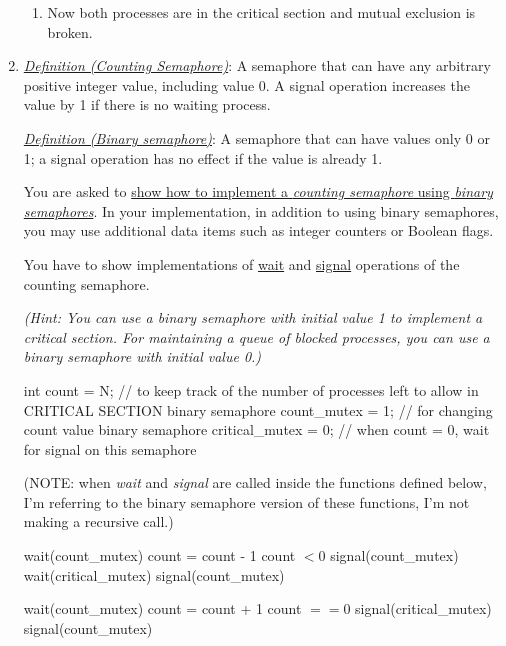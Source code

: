 \documentclass[11pt]{article}
\newcommand{\n}{\vspace{0.3cm}}
\begin{document}
\begin{enumerate}
\begin{enumerate}[label=\arabic*)]
      \item Now both processes are in the critical section and mutual exclusion is broken.
    \end{enumerate}
    \newpage

  \item \textit{\ul{Definition (Counting Semaphore)}}: A semaphore that can have any arbitrary positive integer value, including value 0.  A signal operation increases the value by 1 if there is no waiting process.

    \textit{\ul{Definition (Binary semaphore)}}: A semaphore that can have values only 0 or 1; a signal operation has no effect if the value is already 1. \n

    You are asked to \ul{show how to implement a \textit{counting semaphore} using \textit{binary semaphores}}.  In your implementation, in addition to using binary semaphores, you may use additional data items such as integer counters or Boolean flags.

    You have to show implementations of \ul{wait} and \ul{signal} operations of the counting semaphore.

    \textit{(Hint: You can use a binary semaphore with initial value 1 to implement a critical section.  For maintaining a queue of blocked processes, you can use a binary semaphore with initial value 0.)}


      \begin{codebox}
        \zi int count = N; // to keep track of the number of processes left to allow in CRITICAL SECTION
        \zi binary semaphore count\_mutex = 1; // for changing count value
        \zi binary semaphore critical\_mutex = 0; // when count = 0, wait for signal on this semaphore
      \end{codebox}

      (NOTE: when \textit{wait} and \textit{signal} are called inside the functions defined below, I'm referring to the binary semaphore version of these functions, I'm not making a recursive call.)

    \begin{minipage}{0.45\textwidth}
      \begin{codebox}
       \li wait(count\_mutex)
       \li count = count - 1
       \zi
       \li \If count \(< 0\) \Do
         \li signal(count\_mutex)
         \li wait(critical\_mutex)
       \zi
       \End
       \li
       \Else \Do
        \li signal(count\_mutex)
       \End
      \end{codebox}
    \end{minipage}
    \begin{minipage}{0.45\textwidth}
      \centering
      \begin{codebox}
       \li wait(count\_mutex)
       \li count = count + 1
       \zi
       \li \If count \(== 0\) \Do
         \li signal(critical\_mutex)
       \End
       \zi
       \li signal(count\_mutex)
      \end{codebox}
    \end{minipage} \n


\end{enumerate}
\end{document}
